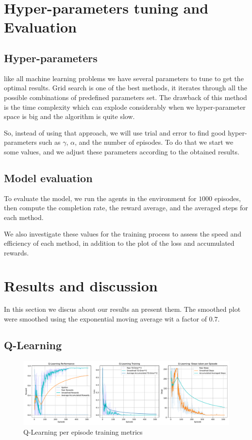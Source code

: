 \section{Hyper-parameters tuning and Evaluation}
\subsection{Hyper-parameters}
like all machine learning problems we have several parameters to tune to get the optimal results. Grid search is one of the best methods, it iterates through all the possible combinations of predefined parameters set. The drawback of this method is the time complexity which can explode considerably when we hyper-parameter space is big and the algorithm is quite slow.

So, instead of using that approach, we will use trial and error to find good hyper-parameters such as $\gamma$, $\alpha$, and the number of episodes. To do that we start we some values, and we adjust these parameters according to the obtained results.

\subsection{Model evaluation}
To evaluate the model, we run the agents in the environment for $1000$ episodes, then compute the completion rate, the reward average, and the averaged steps for each method.

We also investigate these values for the training process to assess the speed and efficiency of each method, in addition to the plot of the loss and accumulated rewards.
\section{Results and discussion}
In this section we discus about our results an present them. The smoothed plot were smoothed using the exponential moving average wit a factor of $0.7$.
\subsection{Q-Learning}
\begin{figure}[H]
	\centering
	\includegraphics[width=\linewidth]{figures/QLearning_episode.pdf}
	\caption{Q-Learning per episode training metrics}
\end{figure}

